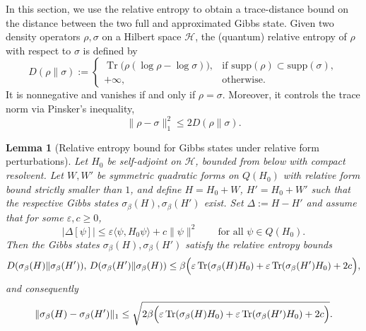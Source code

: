 \documentclass[11pt]{amsart}
\newcommand{\1}{\mathbbm{1}}
\newcommand{\Tr}{\operatorname{Tr}}
\theoremstyle{plain}
\newtheorem{lemma}[theorem]{Lemma}
\theoremstyle{definition}
\theoremstyle{remark}
\numberwithin{equation}{section}
\begin{document}
\noindent In this section, we use the relative entropy to obtain a trace-distance bound on the distance between the two full and approximated Gibbs state. 
Given two density operators \(\rho,\sigma\) on a Hilbert space \(\mathcal H\), the (quantum) relative entropy of \(\rho\) with respect to \(\sigma\) is defined by
\[
D(\rho\|\sigma):=
\begin{cases}
\Tr\bigl(\rho(\log\rho-\log\sigma)\bigr), & \text{if }\mathrm{supp}(\rho)\subset \mathrm{supp}(\sigma),\\
+\infty, & \text{otherwise}.
\end{cases}
\]
It is nonnegative and vanishes if and only if \(\rho=\sigma\). Moreover, it controls the trace norm via Pinsker's inequality,
\[
\|\rho-\sigma\|_1^2 \le 2 D(\rho\|\sigma).
\]
\begin{lemma}[Relative entropy bound for Gibbs states under relative form perturbations]
\label{lem:relative-entropy-relative-form-convergence}
Let \(H_{0}\) be self-adjoint on \(\mathcal H\), bounded from below with compact resolvent. Let \(W,W'\) be symmetric quadratic forms on \(Q(H_0)\) with relative form bound strictly smaller than \(1\), and define \(H=H_0+W\), \(H'=H_0+W'\) such that the respective Gibbs states \(\sigma_\beta(H),\sigma_\beta(H')\) exist. Set \(\Delta:=H-H'\) and assume that for some \(\varepsilon,c\ge0\),
\begin{equation}
\label{eq:relative-form-smallness-delta-entropy}
|\Delta[\psi]|\le \varepsilon\langle\psi,H_0\psi\rangle+c\|\psi\|^2\qquad\text{for all }\psi\in Q(H_0).
\end{equation}
Then the Gibbs states \(\sigma_\beta(H),\sigma_\beta(H')\) satisfy the relative entropy bounds
\begin{equation}
D(\sigma_\beta(H)\|\sigma_\beta(H')),\,D(\sigma_\beta(H')\|\sigma_\beta(H))
\le \beta\Bigl(\varepsilon \Tr(\sigma_\beta(H)H_0)+\varepsilon \Tr(\sigma_\beta(H')H_0)+2c\Bigr),
\end{equation}
and consequently
\begin{equation}
\|\sigma_\beta(H)-\sigma_\beta(H')\|_1
\le \sqrt{2\beta\Bigl(\varepsilon \Tr(\sigma_\beta(H)H_0)+\varepsilon \Tr(\sigma_\beta(H')H_0)+2c\Bigr)}.
\end{equation}
\end{lemma}
\end{document}
